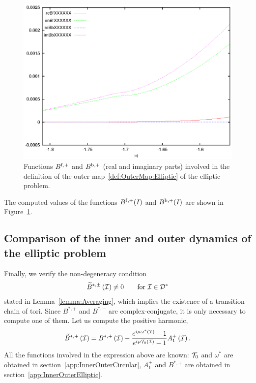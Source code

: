 \begin{figure}
\includegraphics{figs/B_fb}
\caption{Functions $B^{\mathrm{f},+}$ and $B^{\mathrm{b},+}$ (real and imaginary parts) 
involved in the definition of the outer
map~\eqref{def:OuterMap:Elliptic} of the elliptic problem.}
\label{fig:B_fb}
\end{figure}

The computed values of the functions $B^{\mathrm{f},+}(I)$ and $B^{\mathrm{b},+}(I)$ are
shown in Figure~\ref{fig:B_fb}.


\subsection{Comparison of the inner and outer dynamics of the elliptic problem}\label{app:Comparison}

Finally, we verify the non-degeneracy
condition
 \begin{equation}\label{eq:NonVanishing:Outer:Numerics}
   \widetilde B^{\ast,\pm} \left(\mathcal{I}\right)\neq 0\qquad\text{for }\mathcal{I}\in
\mathcal{D}^\ast
 \end{equation}
stated in Lemma~\ref{lemma:Averaging}, which implies the existence of
a transition chain of tori.
Since $B^{\ast,+}$ and $B^{\ast,-}$ are complex-conjugate, it is only
necessary to compute one of them. Let us compute the positive
harmonic,
 \[
 \widetilde B^{\ast,+} \left(\mathcal{I}\right)=B^{\ast,+}
\left(\mathcal{I}\right)-\frac{e^{i\mu\omega^\ast(\mathcal{I})}-1}{e^{
i\mu\mathcal{T}_0(\mathcal{I})}-1}A_1^+ \left(\mathcal{I}\right).
 \]
All the functions involved in the expression above are known: $\mathcal{T}_0$
and $\omega^\ast$ are obtained in
section~\ref{app:InnerOuterCircular}, $A_1^+$ and $B^{\ast,+}$ are
obtained in section~\ref{app:InnerOuterElliptic}.

